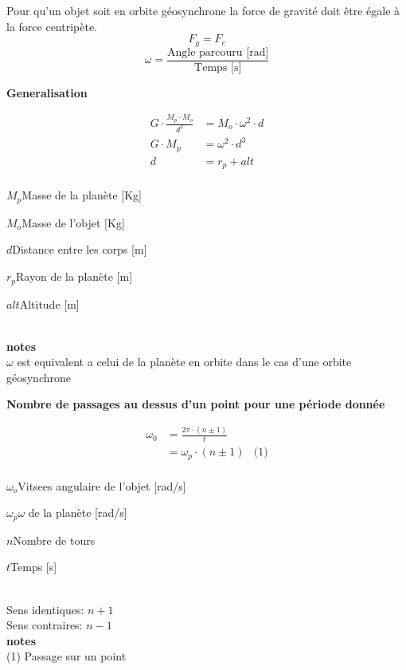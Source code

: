 \documentclass[12pt,a4paper]{article} %
\newcommand\frametitle[1]{ {\bfseries #1} \\[5pt] }
\newcommand\framenote[1]{
	{\small {\bfseries notes} \\ #1}
}
\begin{document}
\begin{mdframed}
	Pour qu'un objet soit en orbite géosynchrone la force de gravité doit être égale à la force centripète.
	\[F_g = F_c\]
	\[\omega = \frac{\text{Angle parcouru [rad]}}{\text{Temps [s]}}\]

	\textbf{Generalisation} \\
	\begin{twocols}
		\begin{align*}
			G\cdot\frac{M_p\cdot M_o}{d^2} &= M_o \cdot \omega^2 \cdot d \\
			G \cdot M_p &= \omega^2 \cdot d^3 \\
			d &= r_p + alt \\
		\end{align*}

	\nextcol

		\begin{vardef}
			\item{$M_p$}{Masse de la planète [Kg]}
			\item{$M_o$}{Masse de l'objet [Kg]}
			\item{$d$}{Distance entre les corps [m]}
			\item{$r_p$}{Rayon de la planète [m]}
			\item{$alt$}{Altitude [m]}
		\end{vardef}

	\end{twocols}
	\\ \framenote{$\omega$ est equivalent a celui de la planète en orbite dans le cas d'une orbite géosynchrone}
\end{mdframed}

\vspace{1em}

\begin{mdframed}
	\frametitle{Nombre de passages au dessus d'un point pour une période donnée}

	\begin{twocols}
		\begin{align*}
			\omega_0 &= \frac{2 \pi \cdot (n \pm 1)}{t} \\
			&= \omega_p \cdot (n \pm 1) & \text{(1)} \\
		\end{align*}
	\nextcol
		\begin{vardef}
			\item{$\omega_o$}{Vitsees angulaire de l'objet [rad/s]}
			\item{$\omega_p$}{$\omega$ de la planète [rad/s]}
			\item{$n$}{Nombre de tours}
			\item{$t$}{Temps [s]}
		\end{vardef}
		\\[1em]
		Sens identiques: $n+1$ \\
		Sens contraires: $n-1$ \\
		\framenote{(1) Passage sur un point}
	\end{twocols}
\end{mdframed}
\end{document}
